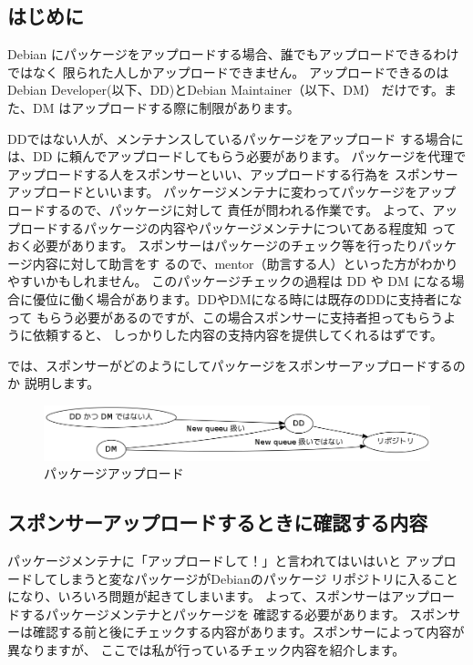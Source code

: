 \documentclass[mingoth,a4paper]{jsarticle}
\begin{document}
\subsection{はじめに}

Debian にパッケージをアップロードする場合、誰でもアップロードできるわけではなく
限られた人しかアップロードできません。
アップロードできるのはDebian Developer(以下、DD)とDebian Maintainer（以下、DM）
だけです。また、DM はアップロードする際に制限があります。


%

 
DDではない人が、メンテナンスしているパッケージをアップロード
する場合には、DD に頼んでアップロードしてもらう必要があります。
パッケージを代理でアップロードする人をスポンサーといい、アップロードする行為を
スポンサーアップロードといいます。
パッケージメンテナに変わってパッケージをアップロードするので、パッケージに対して
責任が問われる作業です。
よって、アップロードするパッケージの内容やパッケージメンテナについてある程度知
っておく必要があります。
スポンサーはパッケージのチェック等を行ったりパッケージ内容に対して助言をす
るので、mentor（助言する人）といった方がわかりやすいかもしれません。 
このパッケージチェックの過程は DD や DM
になる場合に優位に働く場合があります。DDやDMになる時には既存のDDに支持者になって
もらう必要があるのですが、この場合スポンサーに支持者担ってもらうように依頼すると、
しっかりした内容の支持内容を提供してくれるはずです。

では、スポンサーがどのようにしてパッケージをスポンサーアップロードするのか
説明します。

\begin{figure}[ht]
 \begin{center}
  \includegraphics[width=0.8\hsize]{image201108/sponsor0.png}
 \end{center}
\label{fig:sponsor0}\caption{パッケージアップロード}
\end{figure}

\subsection{スポンサーアップロードするときに確認する内容}

パッケージメンテナに「アップロードして！」と言われてはいはいと 
アップロードしてしまうと変なパッケージがDebianのパッケージ
リポジトリに入ることになり、いろいろ問題が起きてしまいます。
よって、スポンサーはアップロードするパッケージメンテナとパッケージを
確認する必要があります。
スポンサーは確認する前と後にチェックする内容があります。スポンサーによって内容が異なりますが、
ここでは私が行っているチェック内容を紹介します。
\end{document}
